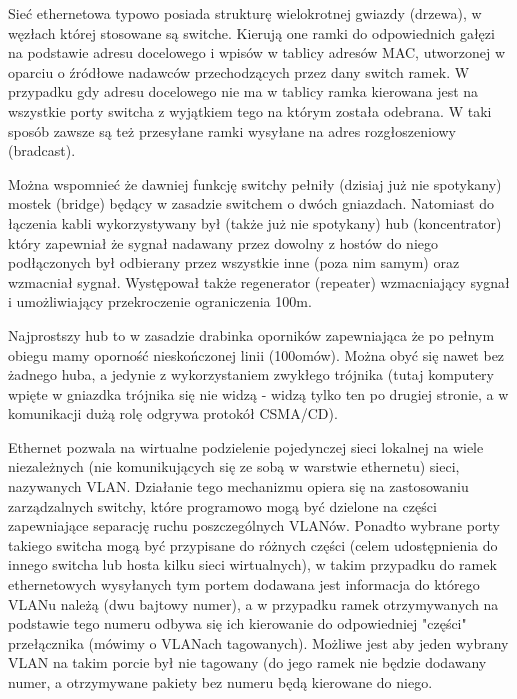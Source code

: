 Sieć ethernetowa typowo posiada strukturę wielokrotnej gwiazdy (drzewa), w węzłach której stosowane są switche. Kierują one ramki do odpowiednich gałęzi na podstawie adresu docelowego i wpisów w tablicy adresów MAC, utworzonej w oparciu o źródłowe nadawców przechodzących przez dany switch ramek. W przypadku gdy adresu docelowego nie ma w tablicy ramka kierowana jest na wszystkie porty switcha z wyjątkiem tego na którym została odebrana. W taki sposób zawsze są też przesyłane ramki wysyłane na adres rozgłoszeniowy (bradcast).

\begin{teacherOnly} %
Można wspomnieć że dawniej funkcję switchy pełniły (dzisiaj już nie spotykany) mostek (bridge) będący w zasadzie switchem o dwóch gniazdach.
Natomiast do łączenia kabli wykorzystywany był (także już nie spotykany) hub (koncentrator) który zapewniał że sygnał nadawany przez dowolny z hostów do niego podłączonych był odbierany przez wszystkie inne (poza nim samym) oraz wzmacniał sygnał. Występował także regenerator (repeater) wzmacniający sygnał i umożliwiający przekroczenie ograniczenia 100m.

Najprostszy hub to w zasadzie drabinka oporników zapewniająca że po pełnym obiegu mamy oporność nieskończonej linii (100omów).
Można obyć się nawet bez żadnego huba, a jedynie z wykorzystaniem zwykłego trójnika (tutaj komputery wpięte w gniazdka trójnika się nie widzą - widzą tylko ten po drugiej stronie, a w komunikacji dużą rolę odgrywa protokół CSMA/CD).
\end{teacherOnly}

Ethernet pozwala na wirtualne podzielenie pojedynczej sieci lokalnej na wiele niezależnych (nie komunikujących się ze sobą w warstwie ethernetu) sieci, nazywanych VLAN. Działanie tego mechanizmu opiera się na zastosowaniu zarządzalnych switchy, które programowo mogą być dzielone na części zapewniające separację ruchu poszczególnych VLANów. Ponadto wybrane porty takiego switcha mogą być przypisane do różnych części (celem udostępnienia do innego switcha lub hosta kilku sieci wirtualnych), w takim przypadku do ramek ethernetowych wysyłanych tym portem dodawana jest informacja do którego VLANu należą (dwu bajtowy numer), a w przypadku ramek otrzymywanych na podstawie tego numeru odbywa się ich kierowanie do odpowiedniej "części" przełącznika (mówimy o VLANach tagowanych). Możliwe jest aby jeden wybrany VLAN na takim porcie był nie tagowany (do jego ramek nie będzie dodawany numer, a otrzymywane pakiety bez numeru będą kierowane do niego.

